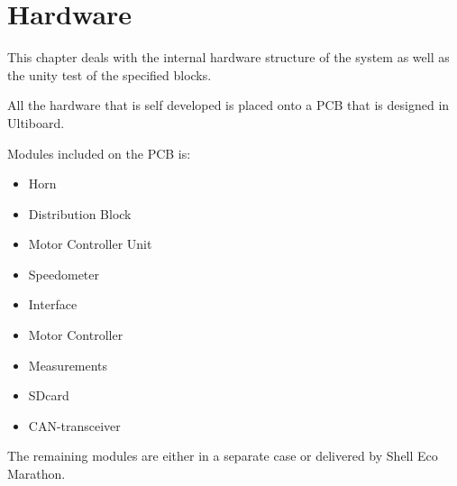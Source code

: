 \chapter{Hardware}
This chapter deals with the internal hardware structure of the system as well as the unity test of the specified blocks.

All the hardware that is self developed is placed onto a PCB that is designed in Ultiboard. 

Modules included on the PCB is:

\begin{itemize}
	\item{Horn}
	\item{Distribution Block}
	\item{Motor Controller Unit}
	\item{Speedometer}
	\item{Interface}
	\item{Motor Controller}
	\item{Measurements}
	\item{SDcard}
	\item{CAN-transceiver}
\end{itemize}

The remaining modules are either in a separate case or delivered by Shell Eco Marathon. 












